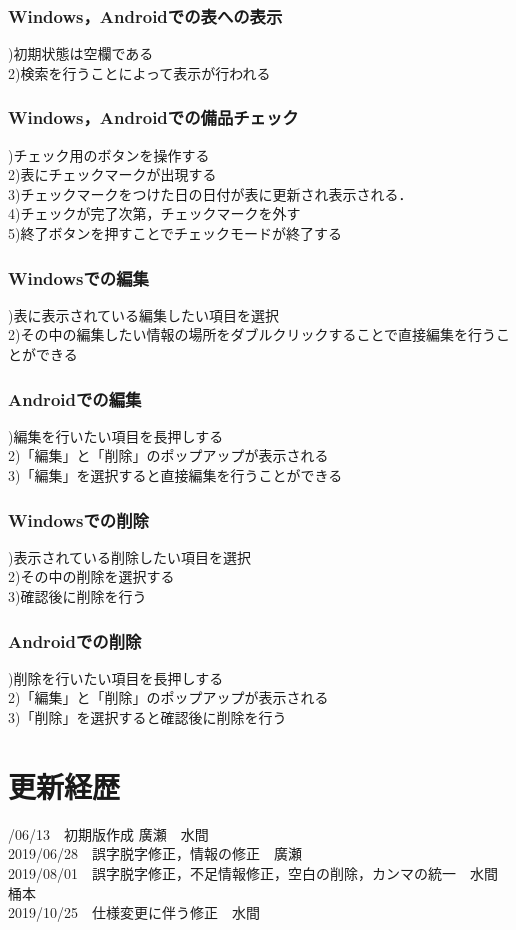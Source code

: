 \documentclass[11pt,a4j]{jarticle}
\begin{document}
\subsubsection{Windows，Androidでの表への表示}
)初期状態は空欄である
\\2)検索を行うことによって表示が行われる

\subsubsection{Windows，Androidでの備品チェック}
)チェック用のボタンを操作する
\\2)表にチェックマークが出現する
\\3)チェックマークをつけた日の日付が表に更新され表示される．
\\4)チェックが完了次第，チェックマークを外す
\\5)終了ボタンを押すことでチェックモードが終了する

\subsubsection{Windowsでの編集}
)表に表示されている編集したい項目を選択
\\2)その中の編集したい情報の場所をダブルクリックすることで直接編集を行うことができる

\subsubsection{Androidでの編集}
)編集を行いたい項目を長押しする
\\2)「編集」と「削除」のポップアップが表示される
\\3)「編集」を選択すると直接編集を行うことができる

\subsubsection{Windowsでの削除}
)表示されている削除したい項目を選択
\\2)その中の削除を選択する
\\3)確認後に削除を行う

\subsubsection{Androidでの削除}
)削除を行いたい項目を長押しする
\\2)「編集」と「削除」のポップアップが表示される
\\3)「削除」を選択すると確認後に削除を行う

  \newpage
  \section{更新経歴}
  /06/13　初期版作成	廣瀬　水間
  \\2019/06/28　誤字脱字修正，情報の修正　廣瀬
  \\2019/08/01　誤字脱字修正，不足情報修正，空白の削除，カンマの統一　水間　桶本
  \\2019/10/25　仕様変更に伴う修正　水間
\end{document}
